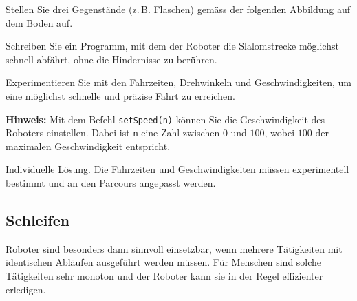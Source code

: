 \begin{myexercise}

    Stellen Sie drei Gegenstände (z.\,B. Flaschen)
    gemäss der folgenden Abbildung auf dem Boden auf.

    \begin{center}
    \end{center}

    Schreiben Sie ein Programm, mit dem der Roboter
    die Slalomstrecke möglichst schnell abfährt,
    ohne die Hindernisse zu berühren.

    Experimentieren Sie mit den Fahrzeiten,
    Drehwinkeln und Geschwindigkeiten, um
    eine möglichst schnelle und präzise
    Fahrt zu erreichen.

    \textbf{Hinweis:}
    Mit dem Befehl \texttt{setSpeed(n)} können Sie
    die Geschwindigkeit des Roboters einstellen.
    Dabei ist \texttt{n} eine Zahl zwischen
    \(0\) und \(100\), wobei \(100\) der maximalen
    Geschwindigkeit entspricht.

    \begin{myanswer}
        Individuelle Lösung. Die Fahrzeiten und
        Geschwindigkeiten müssen experimentell
        bestimmt und an den Parcours angepasst werden.
    \end{myanswer}
\end{myexercise}


\subsection*{Schleifen}
Roboter sind besonders dann sinnvoll einsetzbar, wenn mehrere Tätigkeiten
mit identischen Abläufen ausgeführt werden müssen. Für Menschen sind solche
Tätigkeiten sehr monoton und der Roboter kann sie in der Regel effizienter
erledigen.


